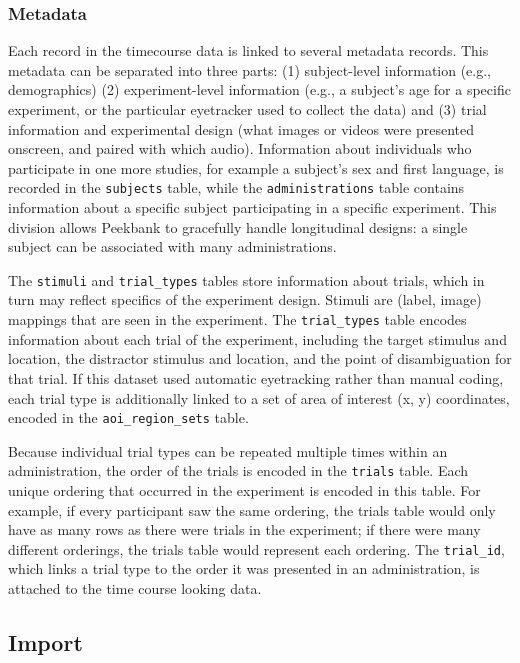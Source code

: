 \documentclass[
  english,
  man,floatsintext]{apa6}
\begin{document}
\hypertarget{metadata}{%
\subsubsection{Metadata}\label{metadata}}

Each record in the timecourse data is linked to several metadata records.
This metadata can be separated into three parts: (1) subject-level information (e.g., demographics) (2) experiment-level information (e.g., a subject's age for a specific experiment, or the particular eyetracker used to collect the data) and (3) trial information and experimental design (what images or videos were presented onscreen, and paired with which audio).
Information about individuals who participate in one more studies, for example a subject's sex and first language, is recorded in the \texttt{subjects} table, while the \texttt{administrations} table contains information about a specific subject participating in a specific experiment.
This division allows Peekbank to gracefully handle longitudinal designs: a single subject can be associated with many administrations.

The \texttt{stimuli} and \texttt{trial\_types} tables store information about trials, which in turn may reflect specifics of the experiment design.
Stimuli are (label, image) mappings that are seen in the experiment.
The \texttt{trial\_types} table encodes information about each trial of the experiment, including the target stimulus and location, the distractor stimulus and location, and the point of disambiguation for that trial.
If this dataset used automatic eyetracking rather than manual coding, each trial type is additionally linked to a set of area of interest (x, y) coordinates, encoded in the \texttt{aoi\_region\_sets} table.

Because individual trial types can be repeated multiple times within an administration, the order of the trials is encoded in the \texttt{trials} table.
Each unique ordering that occurred in the experiment is encoded in this table.
For example, if every participant saw the same ordering, the trials table would only have as many rows as there were trials in the experiment; if there were many different orderings, the trials table would represent each ordering.
The \texttt{trial\_id}, which links a trial type to the order it was presented in an administration, is attached to the time course looking data.

\hypertarget{import}{%
\subsection{Import}\label{import}}
\end{document}
